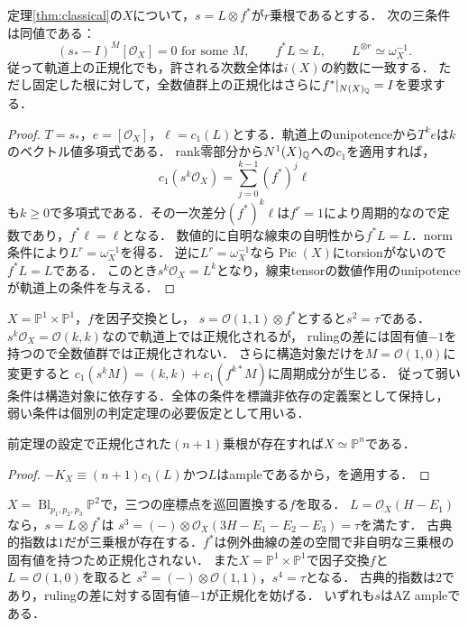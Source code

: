 \documentclass[11pt,a4paper]{ltjsarticle}
\begin{document}
\begin{proposition}[軌道上の正規化の正確な強さ]\label{prop:orbit-classical}
定理\ref{thm:classical}の$X$について，$s=L\otimes f^*$が$r$乗根であるとする．
次の三条件は同値である：
\[
 (s_*-I)^M[\mathcal O_X]=0\text{ for some }M,
 \qquad f^*L\simeq L,
 \qquad L^{\otimes r}\simeq\omega_X^{-1}.
\]
従って軌道上の正規化でも，許される次数全体は$i(X)$の約数に一致する．
ただし固定した根に対して，全数値群上の正規化はさらに$f^*|_{N(X)_{\mathbb Q}}=I$を要求する．
\end{proposition}
\begin{proof}
$T=s_*$，$e=[\mathcal O_X]$，$\ell=c_1(L)$とする．軌道上のunipotenceから$T^ke$は$k$のベクトル値多項式である．
rank零部分から$N^1(X)_{\mathbb Q}$への$c_1$を適用すれば，
\[
 c_1(s^k\mathcal O_X)=\sum_{j=0}^{k-1}(f^*)^j\ell
\]
も$k\ge0$で多項式である．その一次差分$(f^*)^k\ell$は$f^r=1$により周期的なので定数であり，$f^*\ell=\ell$となる．
数値的に自明な線束の自明性から$f^*L=L$．norm条件により$L^r=\omega_X^{-1}$を得る．
逆に$L^r=\omega_X^{-1}$なら$\operatorname{Pic}(X)$にtorsionがないので$f^*L=L$である．
このとき$s^k\mathcal O_X=L^k$となり，線束tensorの数値作用のunipotenceが軌道上の条件を与える．
\end{proof}

\begin{example}[二つの正規化が異なる根]\label{ex:weak-strong}
$X=\mathbb P^1\times\mathbb P^1$，$f$を因子交換とし，
$s=\mathcal O(1,1)\otimes f^*$とすると$s^2=\tau$である．
$s^k\mathcal O_X=\mathcal O(k,k)$なので軌道上では正規化されるが，
rulingの差には固有値$-1$を持つので全数値群では正規化されない．
さらに構造対象だけを$M=\mathcal O(1,0)$に変更すると
$c_1(s^kM)=(k,k)+c_1(f^{k*}M)$に周期成分が生じる．
従って弱い条件は構造対象に依存する．全体の条件を標識非依存の定義案として保持し，
弱い条件は個別の判定定理の必要仮定として用いる．
\end{example}

\begin{corollary}
前定理の設定で正規化された$(n+1)$乗根が存在すれば$X\simeq\mathbb P^n$である．
\end{corollary}
\begin{proof}
$-K_X\equiv(n+1)c_1(L)$かつ$L$はampleであるから，\cite[Corollary 2(1)]{KK}を適用する．
\end{proof}

\begin{example}[正規化前の根とnorm条件]\label{ex:non-normalized}
$X=\operatorname{Bl}_{p_1,p_2,p_3}\mathbb P^2$で，三つの座標点を巡回置換する$f$を取る．
$L=\mathcal O_X(H-E_1)$なら，$s=L\otimes f^*$は
$s^3=(-)\otimes\mathcal O_X(3H-E_1-E_2-E_3)=\tau$を満たす．
古典的指数は$1$だが三乗根が存在する．$f^*$は例外曲線の差の空間で非自明な三乗根の固有値を持つため正規化されない．
また$X=\mathbb P^1\times\mathbb P^1$で因子交換$f$と$L=\mathcal O(1,0)$を取ると
$s^2=(-)\otimes\mathcal O(1,1)$，$s^4=\tau$となる．
古典的指数は$2$であり，rulingの差に対する固有値$-1$が正規化を妨げる．
いずれも$s$はAZ ampleである．
\end{example}
\end{document}
